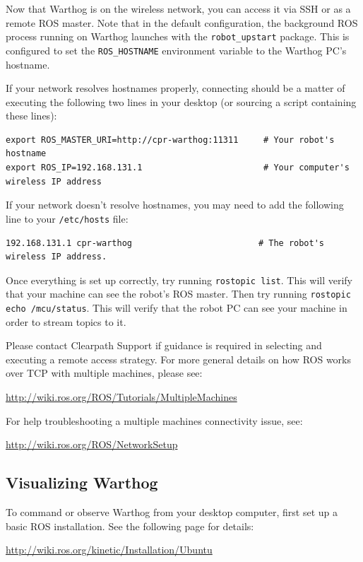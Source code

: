 \documentclass[]{clearpath-latex/clearpath-manual}
\begin{document}
Now that Warthog is on the wireless network, you can access it via SSH or as a remote ROS master. Note that in the default configuration, the background ROS process running on Warthog launches with the \lstinline{robot_upstart} package. This is configured to set the \lstinline{ROS_HOSTNAME} environment variable to the Warthog PC's hostname.

If your network resolves hostnames properly, connecting should be a matter of executing the following two lines in your desktop (or sourcing a script containing these lines):

\begin{lstlisting}
export ROS_MASTER_URI=http://cpr-warthog:11311     # Your robot's hostname
export ROS_IP=192.168.131.1                        # Your computer's wireless IP address
\end{lstlisting}

If your network doesn't resolve hostnames, you may need to add the following line to your \lstinline{/etc/hosts} file:

\begin{lstlisting}
192.168.131.1 cpr-warthog                         # The robot's wireless IP address.
\end{lstlisting}

Once everything is set up correctly, try running \lstinline{rostopic list}. This will verify that your machine can see the robot's ROS master. Then try running \lstinline{rostopic echo /mcu/status}. This will verify that the robot PC can see your machine in order to stream topics to it.

Please contact Clearpath Support if guidance is required in selecting and executing a remote access strategy.
For more general details on how ROS works over TCP with multiple machines, please see:

\url{http://wiki.ros.org/ROS/Tutorials/MultipleMachines}

For help troubleshooting a multiple machines connectivity issue, see:

\url{http://wiki.ros.org/ROS/NetworkSetup}

\subsection{Visualizing Warthog}

To command or observe Warthog from your desktop computer, first set up a basic ROS installation.  See the following page for details:

\url{http://wiki.ros.org/kinetic/Installation/Ubuntu}
\end{document}
